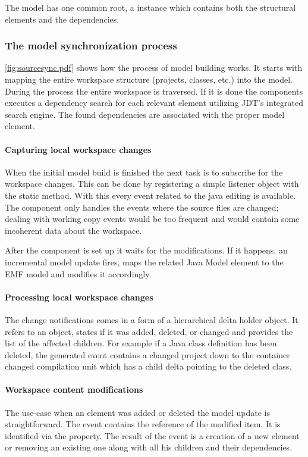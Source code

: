 The model has one common root, a  instance which contains both
the structural elements and the dependencies.

\subsubsection{The model synchronization process}
\autoref{fig:sourcesync.pdf} shows how the process  of model building works. It
starts with mapping the entire workspace structure (projects, classes, etc.)
into the model. During the process the entire workspace is traversed. If it is 
done the components executes a dependency search for each relevant element 
utilizing JDT's integrated search engine. The found dependencies are associated 
with the proper model element.

\paragraph{Capturing local workspace changes}
When the initial model build is finished the next task is to subscribe for the
workspace changes. This can be done by registering a simple listener object with
the   static
method. With this every event related to the java editing is available. The
component only handles the events where the source files are changed; dealing
with working copy events would be too frequent and would contain some incoherent
data about the workspace. 
	
After the component is set up it waits for the modifications. If it happens, an
incremental model update fires, maps the related Java Model element to the EMF
model and modifies it accordingly. 

\paragraph{Processing local workspace changes}
The change notifications comes in a form of a hierarchical delta holder object.
It refers to an object, states if it was added, deleted, or changed and provides
the list of the affected children. For example if a Java class definition has
been deleted, the generated event contains a changed project down to the
container changed compilation unit which has a child delta pointing to the
deleted class.

\paragraph{Workspace content modifications}
The use-case when an element was added or deleted the model update is
straightforward. The event contains the reference of the modified item. It is
identified via the  property. The result of the event is a
creation of a new element or removing an existing one along with all his
children and their dependencies.

